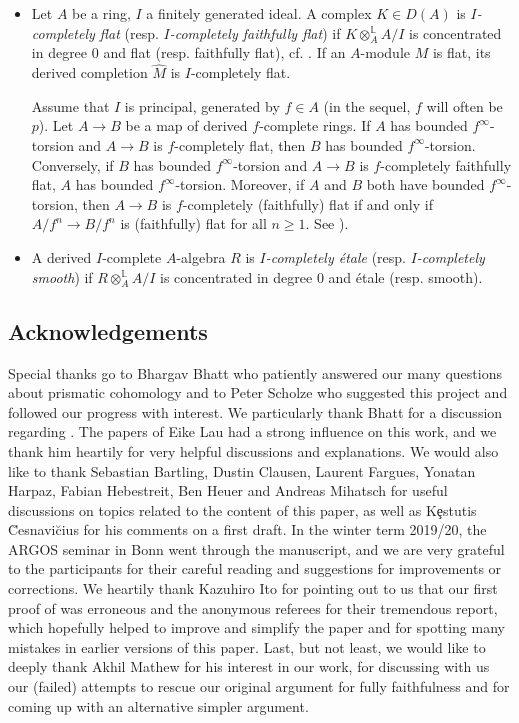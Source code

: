 \documentclass{amsart}
\theoremstyle{plain}
\theoremstyle{definition}
\newcommand{\red}[1]{{\color{black} #1}}
\begin{document}
\begin{itemize}
\item Let $A$ be a ring, $I$ a finitely generated ideal. A complex $K\in D(A)$ is \textit{$I$-completely flat} (resp. \textit{$I$-completely faithfully flat}) if $K \otimes_A^{\mathbb{L}} A/I$ is concentrated in degree $0$ and flat (resp. faithfully flat), cf. \cite[Definition
4.1]{bhatt_morrow_scholze_topological_hochschild_homology}. If an $A$-module $M$ is flat, its derived completion $\widehat{M}$ is $I$-completely flat.

Assume that $I$ is principal, generated by $f \in A$ (in the sequel, $f$ will often be $p$). Let $A\to B$ be a map of derived $f$-complete rings. If $A$ has bounded $f^{\infty}$-torsion and $A\to B$ is $f$-completely flat, then $B$ has bounded $f^{\infty}$-torsion. Conversely, if $B$ has bounded $f^{\infty}$-torsion and $A\to B$ is $f$-completely faithfully flat, $A$ has bounded $f^{\infty}$-torsion. Moreover, if $A$ and $B$ both have bounded $f^{\infty}$-torsion, then $A\to B$ is $f$-completely (faithfully) flat if and only if
$A/f^n \to B/f^n$ is (faithfully) flat for all $n\geq 1$. See \cite[Corollary 4.8]{bhatt_morrow_scholze_topological_hochschild_homology}).

\item A derived $I$-complete $A$-algebra $R$ is \textit{$I$-completely \'etale} (resp. \textit{$I$-completely smooth}) if $R \otimes_A^{\mathbb{L}} A/I$ is concentrated in degree $0$ and \'etale (resp. smooth). 
\end{itemize}

\subsection{Acknowledgements}
\label{sec:acknowledgments}
Special thanks go to Bhargav Bhatt who patiently answered our many questions about prismatic cohomology and to Peter Scholze who suggested this project and followed our progress with interest. We particularly thank Bhatt for a discussion regarding . The papers of Eike Lau had a strong influence on this work, and we thank him heartily for very helpful discussions and explanations. We would also like to thank Sebastian Bartling, Dustin Clausen, Laurent Fargues, \red{Yonatan Harpaz}, Fabian Hebestreit, Ben Heuer and Andreas Mihatsch for useful discussions on topics related to the content of this paper, as well as K\c{e}stutis \u{C}esnavi\u{c}ius for his comments on a first draft. In the winter term 2019/20, the ARGOS seminar in Bonn went through the manuscript, and we are very grateful to the participants for their careful reading and suggestions for improvements or corrections. We heartily thank Kazuhiro Ito for pointing out to us that our first proof of  was erroneous and the anonymous referees for their tremendous report, which hopefully helped to improve and simplify the paper and for spotting many mistakes in earlier versions of this paper. Last, but not least, we would like to deeply thank Akhil Mathew for his interest in our work, for discussing with us our (failed) attempts to rescue our original argument for fully faithfulness and for coming up with an alternative simpler argument. 
\end{document}
